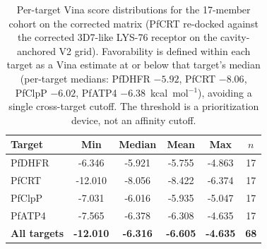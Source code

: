 \begin{table}[htbp]
\centering
\caption{Per-target Vina score distributions for the 17-member cohort on the corrected matrix (PfCRT re-docked against the corrected 3D7-like LYS-76 receptor on the cavity-anchored V2 grid). Favorability is defined within each target as a Vina estimate at or below that target's median (per-target medians: PfDHFR $-5.92$, PfCRT $-8.06$, PfClpP $-6.02$, PfATP4 $-6.38$~kcal~mol$^{-1}$), avoiding a single cross-target cutoff. The threshold is a prioritization device, not an affinity cutoff.}
\label{tab:sm_vina_distributions}
\small
\begin{tabular}{l S[table-format=-1.3] S[table-format=-1.3] S[table-format=-1.3] S[table-format=-1.3] S[table-format=2.0]}
\toprule
Target & {Min} & {Median} & {Mean} & {Max} & {$n$} \\
\midrule
PfDHFR  & -6.346 & -5.921 & -5.755 & -4.863 & 17 \\
PfCRT   & -12.010 & -8.056 & -8.422 & -6.374 & 17 \\
PfClpP  & -7.031 & -6.016 & -5.935 & -5.047 & 17 \\
PfATP4  & -7.565 & -6.378 & -6.308 & -4.635 & 17 \\
\midrule
\textbf{All targets} & \textbf{-12.010} & \textbf{-6.316} & \textbf{-6.605} & \textbf{-4.635} & \textbf{68} \\
\bottomrule
\end{tabular}
\end{table}